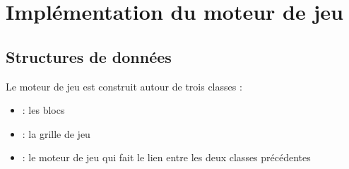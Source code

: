 \chapter{Implémentation du moteur de jeu}

\section{Structures de données}
Le moteur de jeu est construit autour de trois classes :
\begin{itemize}
	\item {} : les blocs 
	\item {} : la grille de jeu
	\item {} : le moteur de jeu qui fait le lien entre les deux classes précédentes
\end{itemize} 



